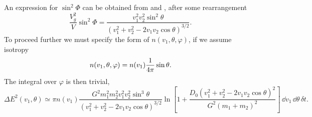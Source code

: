 An expression for $\sin^2\Phi$ can be obtained from  and , after some rearrangement
\begin{equation}
\frac{V_g^2}{V}\sin^2\Phi = \frac{v_1^2v_2^2\sin^2\theta}{\left(v_1^2 + v_2^2 - 2v_1 v_2 \cos\theta\right)^{3/2}}.
\end{equation}
To proceed further we must specify the form of $n(v_1,\theta,\varphi)$, if we assume isotropy
\begin{equation}
n(v_1,\theta,\varphi) = n(v_1)\frac{1}{4\pi}\sin\theta.
\end{equation}
The integral over $\varphi$ is then trivial,
\begin{equation}
\Delta E^2(v_1,\theta) \simeq \pi n(v_1)\frac{G^2m_1^2 m_2^2v_1^2v_2^2\sin^3\theta}{\left(v_1^2 + v_2^2 - 2v_1 v_2 \cos\theta\right)^{3/2}}\ln\left[1 + \frac{D_0\left(v_1^2 + v_2^2 - 2v_1 v_2 \cos\theta\right)^2}{G^2\left(m_1 + m_2\right)^2}\right]\,\dd v_1\,\dd\theta\,\delta t.
\end{equation}

